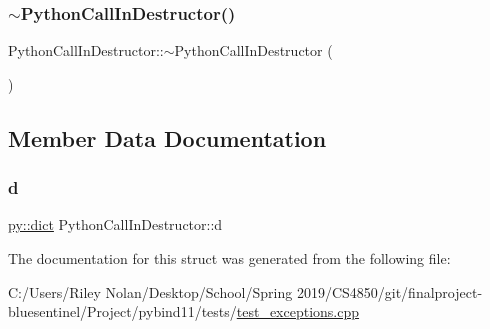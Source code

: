 \mbox{\label{struct_python_call_in_destructor_a11090c7ca44f6e43bad3a03412c82dbd}} 
\subsubsection{\texorpdfstring{$\sim$PythonCallInDestructor()}{~PythonCallInDestructor()}}
{\footnotesize\ttfamily Python\+Call\+In\+Destructor\+::$\sim$\+Python\+Call\+In\+Destructor (\begin{DoxyParamCaption}{ }\end{DoxyParamCaption})\hspace{0.3cm}{\ttfamily [inline]}}



\subsection{Member Data Documentation}
\mbox{\label{struct_python_call_in_destructor_a31f3a6f3e208e088742f96db98bbb553}} 
\subsubsection{\texorpdfstring{d}{d}}
{\footnotesize\ttfamily \mbox{\hyperlink{pyerrors_8h_a9a67a16ee8134b9b5325f6f10bf62b32}{py\+::dict}} Python\+Call\+In\+Destructor\+::d}



The documentation for this struct was generated from the following file\+:\begin{DoxyCompactItemize}
\item 
C\+:/\+Users/\+Riley Nolan/\+Desktop/\+School/\+Spring 2019/\+C\+S4850/git/finalproject-\/bluesentinel/\+Project/pybind11/tests/\mbox{\hyperlink{test__exceptions_8cpp}{test\+\_\+exceptions.\+cpp}}\end{DoxyCompactItemize}
